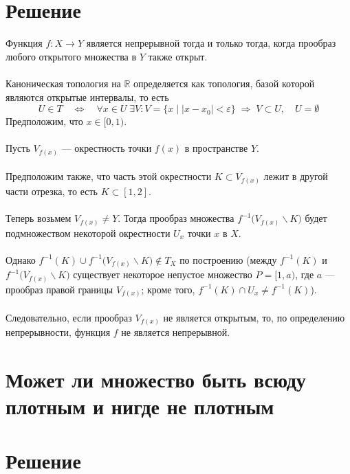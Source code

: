 \documentclass{article}
\begin{document}
        \section*{Решение}
        Функция $f : X \rightarrow Y$ является непрерывной тогда и только тогда, когда прообраз любого открытого множества в $Y$ также открыт. \\ \\ 
        Каноническая топология на $\mathbb{R}$ определяется как топология, базой которой являются открытые интервалы, то есть
        \[
        U \in T \quad \Longleftrightarrow \quad \forall x \in U \; \exists V : V = \{ x \mid |x - x_0| < \varepsilon \} \; \Rightarrow \; V \subset U,\quad U = \emptyset
        \]
        Предположим, что $x \in [0, 1)$.\\   \\
        Пусть $V_{f(x)}$ — окрестность точки $f(x)$ в пространстве $Y$. \\ \\
        Предположим также, что часть этой окрестности $K \subset V_{f(x)}$ лежит в другой части отрезка, то есть $K \subset [1, 2]$. \\ \\
        Теперь возьмем $V_{f(x)} \neq Y$.  
        Тогда прообраз множества $f^{-1} \big(V_{f(x)} \backslash K \big)$ будет подмножеством некоторой окрестности $U_x$ точки $x$ в $X$. \\ \\
        Однако $f^{-1} (K) \cup f^{-1} \big(V_{f(x)} \backslash K \big) \notin T_X$ по построению (между $f^{-1} (K)$ и $f^{-1} \big(V_{f(x)} \backslash K \big)$ существует некоторое непустое множество $P = [1, a)$, где $a$ — прообраз правой границы $V_{f(x)}$; кроме того, $f^{-1} (K) \cap U_x \neq f^{-1}(K)$). \\ \\
        Следовательно, если прообраз $V_{f(x)}$ не является открытым, то, по определению непрерывности, функция $f$ не является непрерывной.
        

        \section{Может ли множество быть всюду плотным и нигде не плотным}


       \section*{Решение}
        
\end{document}
